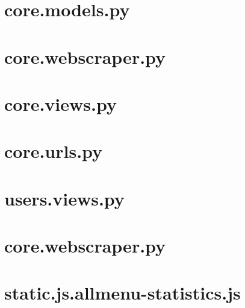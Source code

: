 \section{core.models.py}\label{code:core.models.py}

\section{core.webscraper.py}\label{code:core.webscraper.py}

\section{core.views.py}\label{code:core.views.py}

\section{core.urls.py}\label{code:core.urls.py}

\section{users.views.py}\label{code:users.views.py}

\section{core.webscraper.py}\label{code:core.webscraper.py}

\section{static.js.allmenu-statistics.js}\label{code:static.js.allmenu-statistics.js}

